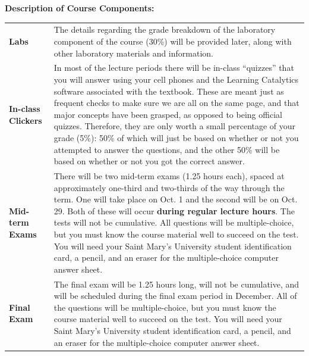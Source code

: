 \documentclass[hidelinks]{article}
\begin{document}
	\newpage
	\textbf{Description of Course Components:}
		\begin{table}[H]
			\begin{tabular}{@{} p{3.0cm} p{13.2cm}}
				\textbf{Labs} & The details regarding the grade breakdown of the laboratory component of the course (30\%) will be provided later, along with other laboratory materials and information.\\
				\addlinespace
				\textbf{In-class Clickers} & In most of the lecture periods there will be in-class ``quizzes'' that you will answer using your cell phones and the Learning Catalytics software associated with the textbook. These are meant just as frequent checks to make sure we are all on the same page, and that major concepts have been grasped, as opposed to being official quizzes. Therefore, they are only worth a small percentage of your grade (5\%): 50\% of which will just be based on whether or not you attempted to answer the questions, and the other 50\% will be based on whether or not you got the correct answer.\\
				\addlinespace
				\textbf{Mid-term Exams} & There will be two mid-term exams (1.25 hours each), spaced at approximately one-third and two-thirds of the way through the term. One will take place on Oct. 1 and the second will be on Oct. 29. Both of these will occur \textbf{during regular lecture hours}. The tests will not be cumulative. All questions will be multiple-choice, but you must know the course material well to succeed on the test. You will need your Saint Mary's University student identification card, a pencil, and an eraser for the multiple-choice computer answer sheet.\\
				\addlinespace
				\textbf{Final Exam} & The final exam will be 1.25 hours long, will not be cumulative, and will be scheduled during the final exam period in December. All of the questions will be multiple-choice, but you must know the course material well to succeed on the test. You will need your Saint Mary's University student identification card, a pencil, and an eraser for the multiple-choice computer answer sheet.\\
			\end{tabular}
		\end{table}


	\vspace{0.3cm}
	
\end{document}

